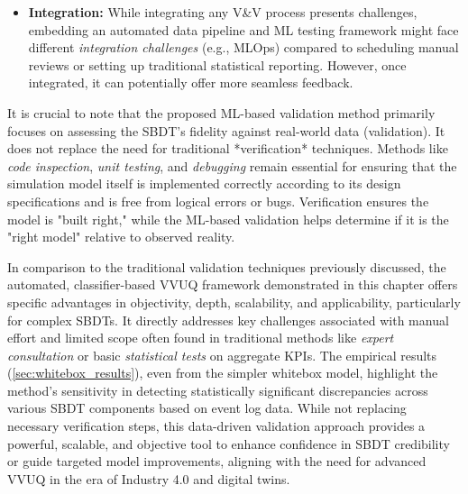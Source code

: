 \begin{itemize}
  \item \textbf{Integration:} While integrating any V&V process presents challenges, embedding an automated data pipeline and ML testing framework might face different \textit{integration challenges} (e.g., MLOps) compared to scheduling manual reviews or setting up traditional statistical reporting. However, once integrated, it can potentially offer more seamless feedback.
\end{itemize}

It is crucial to note that the proposed ML-based validation method primarily focuses on assessing the SBDT's fidelity against real-world data (validation). It does not replace the need for traditional *verification* techniques. Methods like \textit{code inspection}, \textit{unit testing}, and \textit{debugging} remain essential for ensuring that the simulation model itself is implemented correctly according to its design specifications and is free from logical errors or bugs. Verification ensures the model is "built right," while the ML-based validation helps determine if it is the "right model" relative to observed reality.

In comparison to the traditional validation techniques previously discussed, the automated, classifier-based VVUQ framework demonstrated in this chapter offers specific advantages in objectivity, depth, scalability, and applicability, particularly for complex SBDTs. It directly addresses key challenges associated with manual effort and limited scope often found in traditional methods like \textit{expert consultation} or basic \textit{statistical tests} on aggregate KPIs. The empirical results (\autoref{sec:whitebox_results}), even from the simpler whitebox model, highlight the method's sensitivity in detecting statistically significant discrepancies across various SBDT components based on event log data. While not replacing necessary verification steps, this data-driven validation approach provides a powerful, scalable, and objective tool to enhance confidence in SBDT credibility or guide targeted model improvements, aligning with the need for advanced VVUQ in the era of Industry 4.0 and digital twins.

